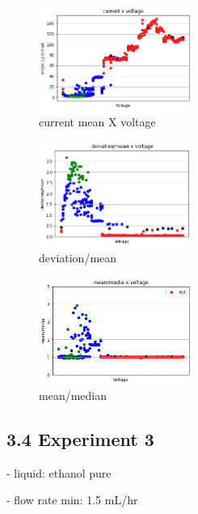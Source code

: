     \begin{multicols}{3}

        \begin{figure}[H]
            \center
            \includegraphics[width=5cm]{images/images_folder_3/data3_sjaaksgraph1.png}
            \caption{current mean X voltage}
        \end{figure}

        \begin{figure}[H]
            \center
            \includegraphics[width=5cm]{images/images_folder_3/data3_sjaaksgraph2.png}
            \caption{deviation/mean}
        \end{figure}

        \begin{figure}[H]
            \center
            \includegraphics[width=5cm]{images/images_folder_3/data3_sjaaksgraph3.png}
            \caption{mean/median}
        \end{figure}

    \end{multicols}


\subsection*{3.4 Experiment 3}

    - liquid: ethanol pure
        
    - flow rate min: 1.5 mL/hr

